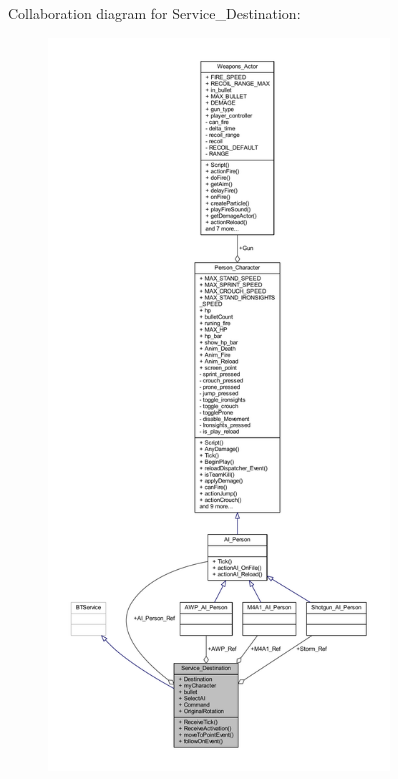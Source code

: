 Collaboration diagram for Service\+\_\+\+Destination\+:\nopagebreak
\begin{figure}[H]
\begin{center}
\leavevmode
\includegraphics[height=550pt]{class_service___destination__coll__graph}
\end{center}
\end{figure}
